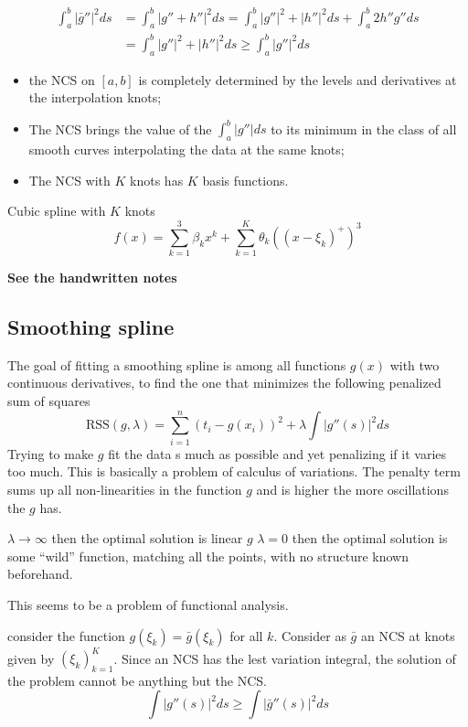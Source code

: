 \documentclass[a4paper]{article}
\newcommand{\clo}[1]{{\left [ #1 \right ]}}
\newcommand{\brac}[1]{{\left ( #1 \right )}}
\newcommand{\abs}[1]{{\left | #1 \right |}}
\newcommand{\RSS}{\text{RSS}}
\begin{document}
\begin{align*}
\int_a^b \abs{\bar{g}''}^2 ds
	&= \int_a^b \abs{g'' + h''}^2 ds = \int_a^b \abs{g''}^2 + \abs{h''}^2 ds + \int_a^b 2h''g'' ds\\
	&= \int_a^b \abs{g''}^2 + \abs{h''}^2 ds \geq \int_a^b \abs{g''}^2 ds
\end{align*}

\begin{itemize}
	\item the NCS on $\clo{a,b}$ is completely determined by the levels and derivatives at the interpolation knots;
	\item The NCS brings the value of the $\int_a^b \abs{g''}ds$ to its minimum in the class of all smooth curves interpolating the data at the same knots;
	\item The NCS with $K$ knots has $K$ basis functions.
\end{itemize}


Cubic spline with $K$ knots
\[f(x) = \sum_{k=1}^3 \beta_k x^k + \sum_{k=1}^K \theta_k \brac{\brac{x-\xi_k}^+}^3\]

\textbf{See the handwritten notes}



\subsection{Smoothing spline} %
\label{sub:smoothing_spline}

The goal of fitting a smoothing spline is among all functions $g(x)$ with two continuous derivatives, to find the one that minimizes the following penalized sum of squares
\[\RSS(g,\lambda) = \sum_{i=1}^n \brac{t_i - g(x_i)}^2 + \lambda \int \abs{g''(s)}^2 ds\]
Trying to make $g$ fit the data s much as possible and yet penalizing if it varies too much. This is basically a problem of calculus of variations. The penalty term sums up all non-linearities in the function $g$ and is higher the more oscillations the $g$ has.

$\lambda\to \infty$ then the optimal solution is linear $g$
$\lambda = 0$ then the optimal solution is some ``wild'' function, matching all the points, with no structure known beforehand.

This seems to be a problem of functional analysis.

consider the function $g(\xi_k) = \bar{g}(\xi_k)$ for all $k$.
Consider as $\bar{g}$ an NCS at knots given by $\brac{\xi_k}_{k=1}^K$.
Since an NCS has the lest variation integral, the solution of the problem cannot be anything but the NCS.
\[\int \abs{g''(s)}^2 ds\geq \int \abs{\bar{g}''(s)}^2 ds\]
\end{document}
